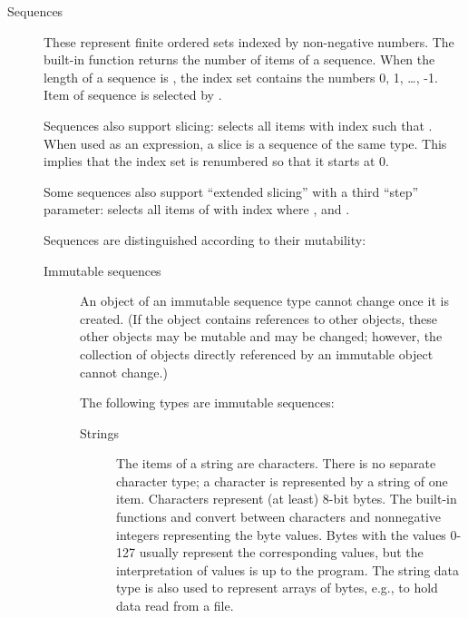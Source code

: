 \begin{description}
\begin{description}
\end{description} %


\item[Sequences]
These represent finite ordered sets indexed by non-negative numbers.
The built-in function  returns the
number of items of a sequence.
When the length of a sequence is , the
index set contains the numbers 0, 1, \ldots, -1.  Item
 of sequence  is selected by .

Sequences also support slicing: 
selects all items with index  such that  \code{<=}
 \code{<} .  When used as an expression, a slice is a
sequence of the same type.  This implies that the index set is
renumbered so that it starts at 0.

Some sequences also support ``extended slicing'' with a third ``step''
parameter:  selects all items
of  with index  where ,  \code{>=}  and  \code{<=}
 \code{<} .

Sequences are distinguished according to their mutability:

\begin{description}

\item[Immutable sequences]
An object of an immutable sequence type cannot change once it is
created.  (If the object contains references to other objects,
these other objects may be mutable and may be changed; however,
the collection of objects directly referenced by an immutable object
cannot change.)

The following types are immutable sequences:

\begin{description}

\item[Strings]
The items of a string are characters.  There is no separate
character type; a character is represented by a string of one item.
Characters represent (at least) 8-bit bytes.  The built-in
functions  and
 convert between characters and
nonnegative integers representing the byte values.  Bytes with the
values 0-127 usually represent the corresponding \ASCII{} values, but
the interpretation of values is up to the program.  The string
data type is also used to represent arrays of bytes, e.g., to hold data
read from a file.


\end{description}
\end{description}
\end{description}
